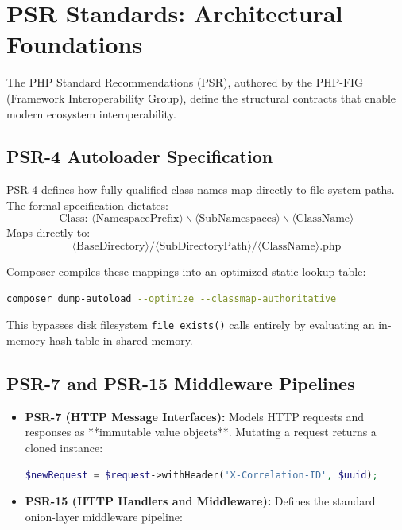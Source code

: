 \section{PSR Standards: Architectural Foundations}

The PHP Standard Recommendations (PSR), authored by the PHP-FIG (Framework Interoperability Group), define the structural contracts that enable modern ecosystem interoperability.

\subsection{PSR-4 Autoloader Specification}

PSR-4 defines how fully-qualified class names map directly to file-system paths. The formal specification dictates:
$$\text{Class: } \langle\text{NamespacePrefix}\rangle\backslash\langle\text{SubNamespaces}\rangle\backslash\langle\text{ClassName}\rangle$$
Maps directly to:
$$\langle\text{BaseDirectory}\rangle/\langle\text{SubDirectoryPath}\rangle/\langle\text{ClassName}\rangle\text{.php}$$

Composer compiles these mappings into an optimized static lookup table:
\begin{lstlisting}[language=sh]
composer dump-autoload --optimize --classmap-authoritative
\end{lstlisting}
This bypasses disk filesystem \texttt{file\_exists()} calls entirely by evaluating an in-memory hash table in shared memory.

\subsection{PSR-7 and PSR-15 Middleware Pipelines}

\begin{itemize}[leftmargin=15pt]
  \item \textbf{PSR-7 (HTTP Message Interfaces):} Models HTTP requests and responses as **immutable value objects**. Mutating a request returns a cloned instance:
  \begin{lstlisting}[language=PHP]
  $newRequest = $request->withHeader('X-Correlation-ID', $uuid);
  \end{lstlisting}
  \item \textbf{PSR-15 (HTTP Handlers and Middleware):} Defines the standard onion-layer middleware pipeline:
\end{itemize}

